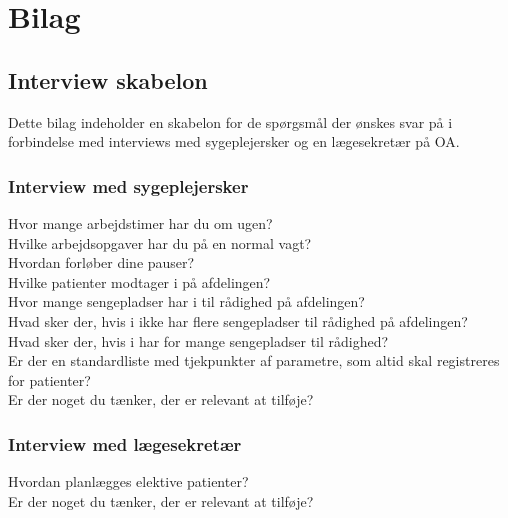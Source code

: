\chapter{Bilag}

\section{Interview skabelon} \label{bilagA}
Dette bilag indeholder en skabelon for de spørgsmål der ønskes svar på i forbindelse med interviews med sygeplejersker og en lægesekretær på OA.

\subsection{Interview med sygeplejersker}
Hvor mange arbejdstimer har du om ugen? \\
\noindent
Hvilke arbejdsopgaver har du på en normal vagt? \\
\noindent
Hvordan forløber dine pauser? \\
\noindent
Hvilke patienter modtager i på afdelingen? \\
\noindent
Hvor mange sengepladser har i til rådighed på afdelingen?  \\
\noindent
Hvad sker der, hvis i ikke har flere sengepladser til rådighed på afdelingen? \\
\noindent
Hvad sker der, hvis i har for mange sengepladser til rådighed? \\
\noindent
Er der en standardliste med tjekpunkter af parametre, som altid skal registreres for patienter? \\
\noindent
Er der noget du tænker, der er relevant at tilføje? \\

\subsection{Interview med lægesekretær}
Hvordan planlægges elektive patienter? \\
\noindent
Er der noget du tænker, der er relevant at tilføje?\\




